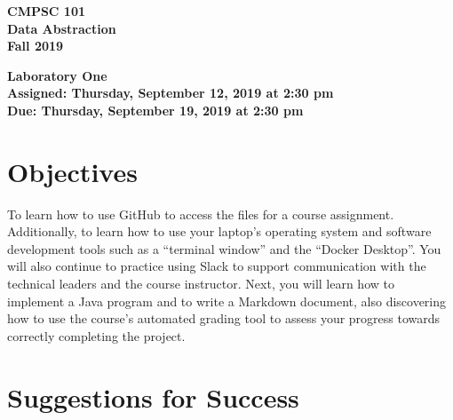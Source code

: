 \documentclass[11pt]{article}
\newcommand{\assignmentduedate}{September 19}
\newcommand{\assignmentassignedate}{September 12}
\newcommand{\assignmentnumber}{One}
\newcommand{\labyear}{2019}
\newcommand{\labday}{Thursday}
\newcommand{\labtime}{2:30 pm}
\newcommand{\assigneddate}{Assigned: \labday, \assignmentassignedate, \labyear{} at \labtime{}}
\newcommand{\duedate}{Due: \labday, \assignmentduedate, \labyear{} at \labtime{}}
\newcommand{\labtitle}[1]
{
  \begin{center}
    \begin{center}
      \bf
      CMPSC 101\\Data Abstraction\\
      Fall 2019\\
      \medskip
    \end{center}
    \bf
    #1
  \end{center}
}
\begin{document}
\thispagestyle{empty}

\labtitle{Laboratory \assignmentnumber{} \\ \assigneddate{} \\ \duedate{}}

\section*{Objectives}

To learn how to use GitHub to access the files for a course assignment.
Additionally, to learn how to use your laptop's operating system and software
development tools such as a ``terminal window'' and the ``Docker Desktop''. You
will also continue to practice using Slack to support communication with the
technical leaders and the course instructor. Next, you will learn how to
implement a Java program and to write a Markdown document, also discovering how
to use the course's automated grading tool to assess your progress towards
correctly completing the project.

\section*{Suggestions for Success}
\end{document}
